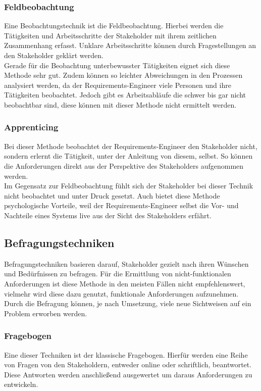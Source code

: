 \subsubsection{Feldbeobachtung}
Eine Beobachtungstechnik ist die Feldbeobachtung. Hierbei werden die Tätigkeiten und Arbeitsschritte der Stakeholder mit ihrem zeitlichen Zusammenhang erfasst. Unklare Arbeitsschritte können durch Fragestellungen an den Stakeholder geklärt werden.\\

Gerade für die Beobachtung unterbewusster Tätigkeiten eignet sich diese Methode sehr gut. Zudem können so leichter Abweichungen in den Prozessen analysiert werden, da der Requirements-Engineer viele Personen und ihre Tätigkeiten beobachtet. Jedoch gibt es Arbeitsabläufe die schwer bis gar nicht beobachtbar sind, diese können mit dieser Methode nicht ermittelt werden.

\subsubsection{Apprenticing}
Bei dieser Methode beobachtet der Requirements-Engineer den Stakeholder nicht, sondern erlernt die Tätigkeit, unter der Anleitung von diesem, selbst. So können die Anforderungen direkt aus der Perspektive des Stakeholders aufgenommen werden.\\

Im Gegensatz zur Feldbeobachtung fühlt sich der Stakeholder bei dieser Technik nicht beobachtet und unter Druck gesetzt. Auch bietet diese Methode psychologische Vorteile, weil der Requirements-Engineer selbst die Vor- und Nachteile eines Systems live aus der Sicht des Stakeholders erfährt.

\subsection{Befragungstechniken}
Befragungstechniken basieren darauf, Stakeholder gezielt nach ihren Wünschen und Bedürfnissen zu befragen. Für die Ermittlung von nicht-funktionalen Anforderungen ist diese Methode in den meisten Fällen nicht empfehlenswert, vielmehr wird diese dazu genutzt, funktionale Anforderungen aufzunehmen. Durch die Befragung können, je nach Umsetzung, viele neue Sichtweisen auf ein Problem erworben werden.

\subsubsection{Fragebogen}
\label{subsubsec:fragebogen}
Eine dieser Techniken ist der klassische Fragebogen. Hierfür werden eine Reihe von Fragen von den Stakeholdern, entweder online oder schriftlich, beantwortet. Diese Antworten werden anschließend ausgewertet um daraus Anforderungen zu entwickeln.\\

